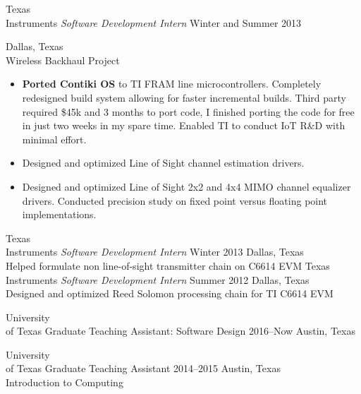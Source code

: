 \documentclass[]{friggeri-cv} %
\begin{document}
\begin{entrylist}
\entry
{Texas \\ Instruments}
{\emph{Software Development Intern}}
{Winter and Summer 2013}
{Dallas, Texas \\ Wireless Backhaul Project
	\begin{itemize}
	\item \textbf{Ported Contiki OS} to TI FRAM line microcontrollers. Completely redesigned build system allowing for faster incremental builds. Third party required \$45k and 3 months to port code, I finished porting the code for free in just two weeks in my spare time. Enabled TI to conduct IoT R\&D with minimal effort.  
	\item Designed and optimized Line of Sight channel estimation drivers.
	\item Designed and optimized Line of Sight 2x2 and 4x4 MIMO channel equalizer drivers. Conducted precision study on fixed point versus floating point implementations.

\end{itemize}}


\entry
{Texas\\  Instruments}
{\emph{Software Development Intern}}
{Winter 2013}
{Dallas, Texas \\
Helped formulate non line-of-sight transmitter chain on C6614 EVM
}
\entry
{Texas \\ Instruments}
{\emph{Software Development Intern}}
{Summer 2012}
{Dallas, Texas \\
Designed and optimized Reed Solomon processing chain for TI C6614 EVM 
}


\entry
{University \\ of Texas}
{Graduate Teaching Assistant: Software Design }
{2016--Now}
{Austin, Texas}


\entry
{University \\ of Texas}
{Graduate Teaching Assistant}
{2014--2015}
{Austin, Texas \\
Introduction to Computing }






\end{entrylist}
\end{document}
